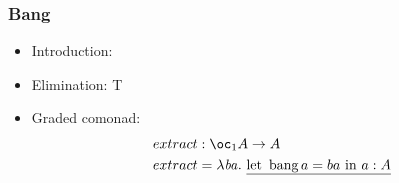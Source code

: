 \documentclass{beamer}
\begin{document}
  \begin{frame}
    \frametitle{Bang}
    \begin{itemize}
    \item Introduction:
                {\ctx{\Gamma}{\Delta} \vdash {} \ni {}}
    \item Elimination:
                {\ctx{\Gamma}{\Delta} \vdash {} \in T}
    \item<4-> Graded comonad:
      \begin{align*}
        \mathop{extract} &: \excl{1}{A} \to A \\
        \mathop{extract} &= \lam{\mathit{ba}}{\emb{\bm{A}{ba}{a}{a}}}
      \end{align*}
    \end{itemize}
  \end{frame}
\end{document}

